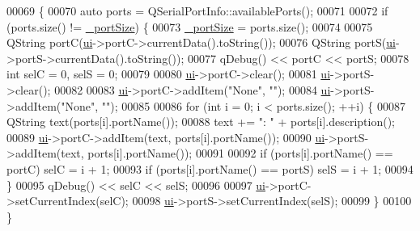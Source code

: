\begin{DoxyCode}
00069 \{
00070     \textcolor{keyword}{auto} ports = QSerialPortInfo::availablePorts();
00071     
00072     \textcolor{keywordflow}{if} (ports.size() != \hyperlink{class_options_window_a9bd4dccc7a544b1db78dc8cf330b88f6}{\_portSize}) \{
00073         \hyperlink{class_options_window_a9bd4dccc7a544b1db78dc8cf330b88f6}{\_portSize} = ports.size();
00074         
00075         QString portC(\hyperlink{class_options_window_a8347442d5b3b670e8fff0c4102db1f88}{ui}->portC->currentData().toString());
00076         QString portS(\hyperlink{class_options_window_a8347442d5b3b670e8fff0c4102db1f88}{ui}->portS->currentData().toString());
00077         qDebug() << portC << portS;
00078         \textcolor{keywordtype}{int} selC = 0, selS = 0;
00079         
00080         \hyperlink{class_options_window_a8347442d5b3b670e8fff0c4102db1f88}{ui}->portC->clear();
00081         \hyperlink{class_options_window_a8347442d5b3b670e8fff0c4102db1f88}{ui}->portS->clear();
00082         
00083         \hyperlink{class_options_window_a8347442d5b3b670e8fff0c4102db1f88}{ui}->portC->addItem(\textcolor{stringliteral}{"None"}, \textcolor{stringliteral}{""});
00084         \hyperlink{class_options_window_a8347442d5b3b670e8fff0c4102db1f88}{ui}->portS->addItem(\textcolor{stringliteral}{"None"}, \textcolor{stringliteral}{""});
00085         
00086         \textcolor{keywordflow}{for} (\textcolor{keywordtype}{int} i = 0; i < ports.size(); ++i) \{
00087             QString text(ports[i].portName());
00088             text += \textcolor{stringliteral}{": "} + ports[i].description();
00089             \hyperlink{class_options_window_a8347442d5b3b670e8fff0c4102db1f88}{ui}->portC->addItem(text, ports[i].portName());
00090             \hyperlink{class_options_window_a8347442d5b3b670e8fff0c4102db1f88}{ui}->portS->addItem(text, ports[i].portName());
00091             
00092             \textcolor{keywordflow}{if} (ports[i].portName() == portC) selC = i + 1;
00093             \textcolor{keywordflow}{if} (ports[i].portName() == portS) selS = i + 1;
00094         \}
00095         qDebug() << selC << selS;
00096         
00097         \hyperlink{class_options_window_a8347442d5b3b670e8fff0c4102db1f88}{ui}->portC->setCurrentIndex(selC);
00098         \hyperlink{class_options_window_a8347442d5b3b670e8fff0c4102db1f88}{ui}->portS->setCurrentIndex(selS);
00099     \}
00100 \}
\end{DoxyCode}
\hypertarget{class_options_window_ae8c0373be58da710194f8d14f1c3c4dc}{}
